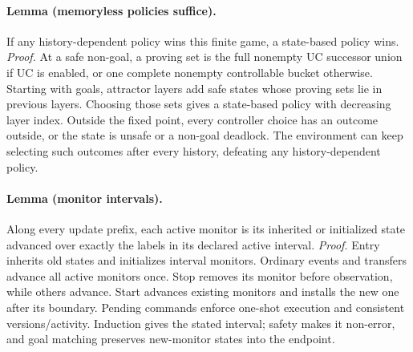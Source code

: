\paragraph{Lemma (memoryless policies suffice).}
If any history-dependent policy wins this finite game, a state-based policy wins.
\emph{Proof.} At a safe non-goal, a proving set is the full nonempty UC successor union if UC is enabled, or one complete nonempty controllable bucket otherwise. Starting with goals, attractor layers add safe states whose proving sets lie in previous layers. Choosing those sets gives a state-based policy with decreasing layer index. Outside the fixed point, every controller choice has an outcome outside, or the state is unsafe or a non-goal deadlock. The environment can keep selecting such outcomes after every history, defeating any history-dependent policy.

\paragraph{Lemma (monitor intervals).}
Along every update prefix, each active monitor is its inherited or initialized state advanced over exactly the labels in its declared active interval.
\emph{Proof.} Entry inherits old states and initializes interval monitors. Ordinary events and transfers advance all active monitors once. Stop removes its monitor before observation, while others advance. Start advances existing monitors and installs the new one after its boundary. Pending commands enforce one-shot execution and consistent versions/activity. Induction gives the stated interval; safety makes it non-error, and goal matching preserves new-monitor states into the endpoint.




